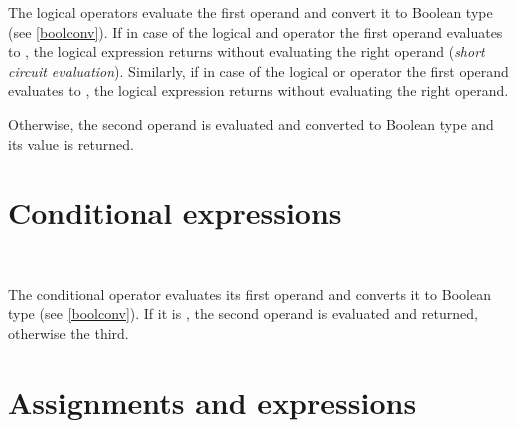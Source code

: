 \noindent
The logical operators evaluate the first operand and convert
it to Boolean type (see \ref{boolconv}). If in case of the
logical and operator \token{\&\&} the first operand evaluates
to , the logical expression returns 
without evaluating the right operand (\textit{short circuit
evaluation}). Similarly, if
in case of the logical or operator \token{\barSY\barSY} the
first operand evaluates to , the logical expression
returns  without evaluating the right operand.

Otherwise, the second operand is evaluated and converted to
Boolean type and its value is returned.

\section{Conditional expressions}

\begin{grammar}
      \produces {} \\
      \produces {} 
          \lextoken{:}
\end{grammar}

\noindent
The conditional operator  evaluates its first operand
and converts it to Boolean type (see \ref{boolconv}). If it
is , the second operand is evaluated and returned,
otherwise the third.

\section{Assignments and expressions}\label{assignments}

\begin{grammar}
      \produces {} \\
      \produces {} \lextoken{=}
          \\
      \produces {} \lextoken{\&=}
          \\
      \produces {} \lextoken{+=}
          \\
      \produces {} \lextoken{$-$=}
          \\
      \produces {}
\end{grammar}

